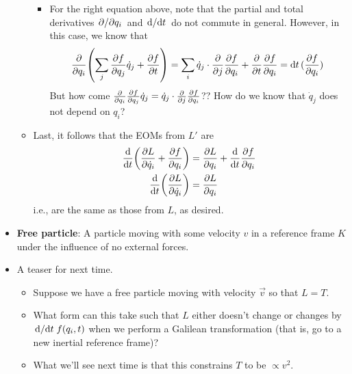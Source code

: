 \documentclass[../notes.tex]{subfiles}
\begin{document}
\begin{itemize}
\begin{itemize}
\begin{itemize}
            \item For the right equation above, note that the partial and total derivatives $\pdv*{q_i}$ and $\dv*{t}$ do not commute in general. However, in this case, we know that
            \begin{equation*}
                \pdv{q_i}(\sum_j\pdv{f}{q_j}\dot{q}_j+\pdv{f}{t}) = \sum_i\dot{q}_j\cdot\pdv{j}\pdv{f}{q_i}+\pdv{t}\pdv{f}{q_i}
                = \dd{t}(\pdv{f}{q_i})
            \end{equation*}
            But how come $\pdv{q_i}\pdv{f}{q_j}\dot{q}_j=\dot{q}_j\cdot\pdv{j}\pdv{f}{q_i}$?? How do we know that $\dot{q}_j$ does not depend on $q_i$?
        \end{itemize}
        \item Last, it follows that the EOMs from $L'$ are
        \begin{align*}
            \dv{t}(\pdv{L}{\dot{q}_i}+\pdv{f}{q_i}) &= \pdv{L}{q_i}+\dv{t}\pdv{f}{q_i}\\
            \dv{t}(\pdv{L}{\dot{q}_i}) &= \pdv{L}{q_i}
        \end{align*}
        i.e., are the same as those from $L$, as desired.
    \end{itemize}
    \item \textbf{Free particle}: A particle moving with some velocity $v$ in a reference frame $K$ under the influence of no external forces.
    \item A teaser for next time.
    \begin{itemize}
        \item Suppose we have a free particle moving with velocity $\vec{v}$ so that $L=T$.
        \item What form can this take such that $L$ either doesn't change or changes by $\dv*{t}f(q_i,t)$ when we perform a Galilean transformation (that is, go to a new inertial reference frame)?
        \item What we'll see next time is that this constrains $T$ to be $\propto v^2$.
    \end{itemize}
\end{itemize}
\end{document}
